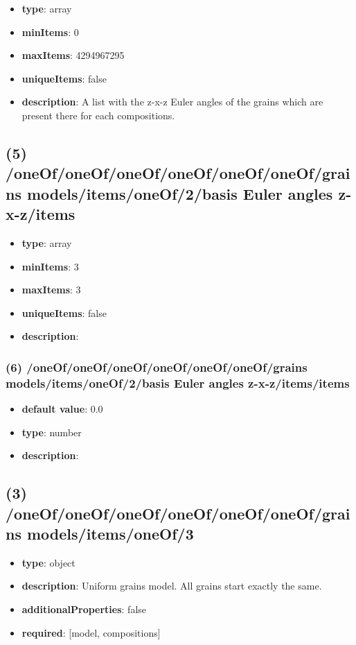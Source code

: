 \begin{itemize}[leftmargin=4em]\item {\bf type}: array
\item {\bf minItems}: 0
\item {\bf maxItems}: 4294967295
\item {\bf uniqueItems}: false
\item {\bf description}: A list with the z-x-z Euler angles of the grains which are present there for each compositions.
\end{itemize}\subsection{(5) /oneOf/oneOf/oneOf/oneOf/oneOf/oneOf/grains models/items/oneOf/2/basis Euler angles z-x-z/items}
\begin{itemize}[leftmargin=5em]\item {\bf type}: array
\item {\bf minItems}: 3
\item {\bf maxItems}: 3
\item {\bf uniqueItems}: false
\item {\bf description}: 
\end{itemize}\subsubsection{(6) /oneOf/oneOf/oneOf/oneOf/oneOf/oneOf/grains models/items/oneOf/2/basis Euler angles z-x-z/items/items}
\begin{itemize}[leftmargin=6em]\item {\bf default value}: 0.0
\item {\bf type}: number
\item {\bf description}: 
\end{itemize}\subsection{(3) /oneOf/oneOf/oneOf/oneOf/oneOf/oneOf/grains models/items/oneOf/3}
\begin{itemize}[leftmargin=3em]\item {\bf type}: object
\item {\bf description}: Uniform grains model. All grains start exactly the same.
\item {\bf additionalProperties}: false
\item {\bf required}: [model, compositions]\end{itemize}
